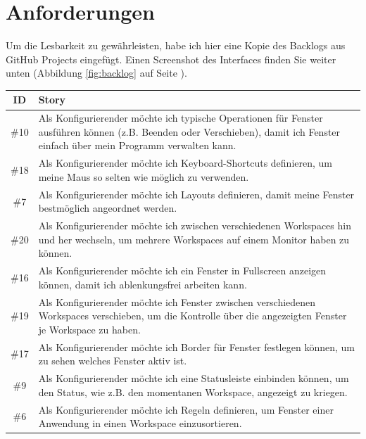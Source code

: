 \documentclass{article}
\begin{document}
\vspace{0em}
\newpage

\section{Anforderungen}

Um die Lesbarkeit zu gewährleisten, habe ich hier eine Kopie des Backlogs aus GitHub Projects eingefügt.
Einen Screenshot des Interfaces finden Sie weiter unten (Abbildung \ref{fig:backlog} auf Seite \pageref{fig:backlog}).

\vspace{1em}

\begin{tabularx}{\textwidth}{|c|X|}
	\hline
	\textbf{ID} & \textbf{Story}                                                                                                                                                                  \\
	\hline
	\#10        & Als Konfigurierender möchte ich typische Operationen für Fenster ausführen können (z.B. Beenden oder Verschieben), damit ich Fenster einfach über mein Programm verwalten kann. \\
	\hline
	\#18        & Als Konfigurierender möchte ich Keyboard-Shortcuts definieren, um meine Maus so selten wie möglich zu verwenden.                                                                \\
	\hline
	\#7         & Als Konfigurierender möchte ich Layouts definieren, damit meine Fenster bestmöglich angeordnet werden.                                                                          \\
	\hline
	\#20        & Als Konfigurierender möchte ich zwischen verschiedenen Workspaces hin und her wechseln, um mehrere Workspaces auf einem Monitor haben zu können.                                \\
	\hline
	\#16        & Als Konfigurierender möchte ich ein Fenster in Fullscreen anzeigen können, damit ich ablenkungsfrei arbeiten kann.                                                              \\
	\hline
	\#19        & Als Konfigurierender möchte ich Fenster zwischen verschiedenen Workspaces verschieben, um die Kontrolle über die angezeigten Fenster je Workspace zu haben.                     \\
	\hline
	\#17        & Als Konfigurierender möchte ich Border für Fenster festlegen können, um zu sehen welches Fenster aktiv ist.                                                                     \\
	\hline
	\#9         & Als Konfigurierender möchte ich eine Statusleiste einbinden können, um den Status, wie z.B. den momentanen Workspace, angezeigt zu kriegen.                                     \\
	\hline
	\#6         & Als Konfigurierender möchte ich Regeln definieren, um Fenster einer Anwendung in einen Workspace einzusortieren.                                                                \\
\end{tabularx}
\end{document}
